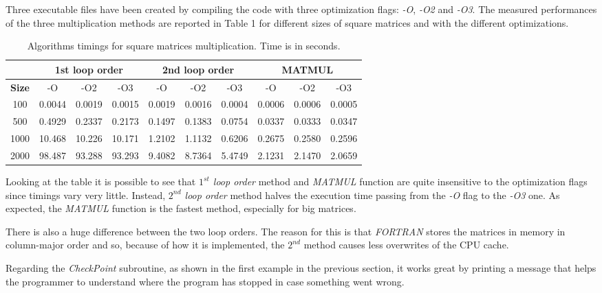 \documentclass[11pt,a4paper]{article}
\begin{document}
Three executable files have been created by compiling the code with three optimization flags: \textit{-O}, \textit{-O2} and \textit{-O3}.
The measured performances of the three multiplication methods are reported in Table 1 for different sizes of square matrices and with the different optimizations.
\begin{table}
	\begin{center}
	\begin{tabular}{c|c|c|c|c|c|c|c|c|c}
		\hline
		& \multicolumn{3}{c|}{\textbf{1st loop order}} &  \multicolumn{3}{c|}{\textbf{2nd loop order}}  &  \multicolumn{3}{c}{\textbf{MATMUL}}  \\
		\hline
		\textbf{Size} & -O  & -O2  & -O3  & -O   & -O2    & -O3    & -O     & -O2    & -O3    \\
		\hline
		100  & 0.0044 & 0.0019 & 0.0015 & 0.0019 & 0.0016 & 0.0004 & 0.0006 & 0.0006 & 0.0005 \\
		\hline
		500  & 0.4929 & 0.2337 & 0.2173 & 0.1497 & 0.1383 & 0.0754 & 0.0337 & 0.0333 & 0.0347 \\
		\hline
		1000 & 10.468 & 10.226 & 10.171 & 1.2102 & 1.1132 & 0.6206 & 0.2675 & 0.2580 & 0.2596 \\
		\hline
		2000 & 98.487 & 93.288 & 93.293 & 9.4082 & 8.7364 & 5.4749 & 2.1231 & 2.1470 & 2.0659 \\
		\hline
	\end{tabular}
	\end{center}
	\caption{Algorithms timings for square matrices multiplication. Time is in seconds.}
\end{table} 

Looking at the table it is possible to see that \textit{$1^{st}$ loop order} method and \textit{MATMUL} function are quite insensitive to the optimization flags since timings vary very little. 
Instead, \textit{$2^{nd}$ loop order} method halves the execution time passing from the \textit{-O} flag to the \textit{-O3} one.
As expected, the \textit{MATMUL} function is the fastest method, especially for big matrices. 

There is also a huge difference between the two loop orders. The reason for this is that \textit{FORTRAN} stores the matrices in memory in column-major order and so, because of how it is implemented, the $2^{nd}$ method causes less overwrites of the CPU cache.

Regarding the \textit{CheckPoint} subroutine, as shown in the first example in the previous section, it works great by printing a message that helps the programmer to understand where the program has stopped in case something went wrong.
\end{document}
